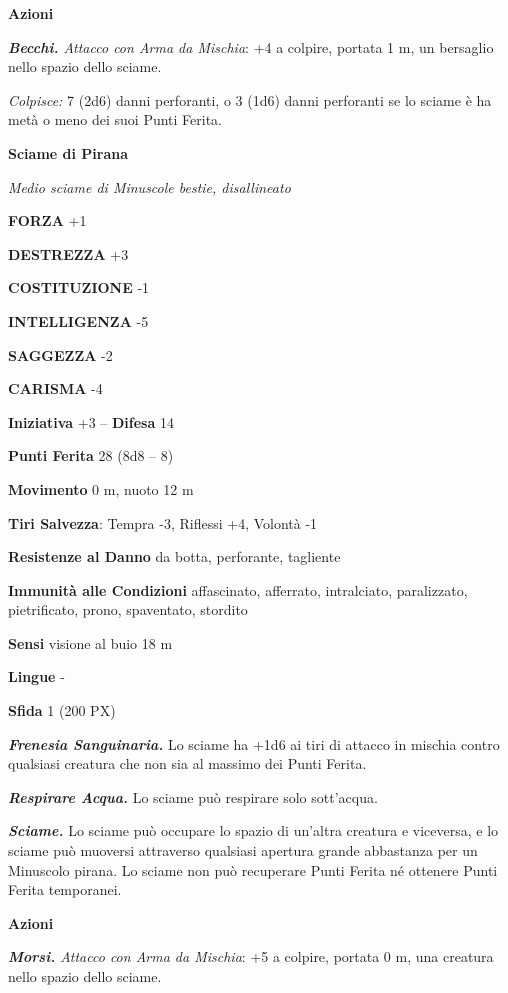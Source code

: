 \begin{multicols}{2}
\textbf{Azioni}

\textit{\textbf{Becchi.} Attacco con Arma da Mischia}: +4 a colpire, portata 1 m, un bersaglio nello spazio dello sciame.

\textit{Colpisce:} 7 (2d6) danni perforanti, o 3 (1d6) danni perforanti se lo sciame è ha metà o meno dei suoi Punti Ferita.

\medskip\textbf{Sciame di Pirana}

\textit{Medio sciame di Minuscole bestie, disallineato}

\textbf{FORZA} +1

\textbf{DESTREZZA} +3

\textbf{COSTITUZIONE} -1

\textbf{INTELLIGENZA} -5

\textbf{SAGGEZZA} -2

\textbf{CARISMA} -4

\textbf{Iniziativa} +3 -- \textbf{Difesa} 14

\textbf{Punti Ferita} 28 (8d8 -- 8)

\textbf{Movimento} 0 m, nuoto 12 m

\textbf{Tiri Salvezza}: Tempra -3, Riflessi +4, Volontà -1

\textbf{Resistenze al Danno} da botta, perforante, tagliente

\textbf{Immunità alle Condizioni} affascinato, afferrato, intralciato, paralizzato, pietrificato, prono, spaventato, stordito

\textbf{Sensi} visione al buio 18 m

\textbf{Lingue} -

\textbf{Sfida} 1 (200 PX)

\textit{\textbf{Frenesia Sanguinaria.}} Lo sciame ha +1d6 ai tiri di attacco in mischia contro qualsiasi creatura che non sia al massimo dei Punti Ferita.

\textit{\textbf{Respirare Acqua.}} Lo sciame può respirare solo sott'acqua.

\textit{\textbf{Sciame.}} Lo sciame può occupare lo spazio di un'altra creatura e viceversa, e lo sciame può muoversi attraverso qualsiasi apertura grande abbastanza per un Minuscolo pirana. Lo sciame non può recuperare Punti Ferita né ottenere Punti Ferita temporanei.

\textbf{Azioni}

\textit{\textbf{Morsi.} Attacco con Arma da Mischia}: +5 a colpire, portata 0 m, una creatura nello spazio dello sciame.


\end{multicols}
